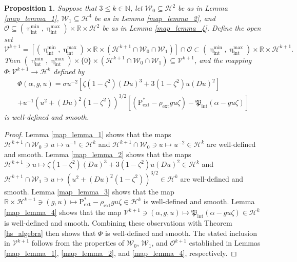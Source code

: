 \documentclass[11pt,reqno]{amsart}
\numberwithin{equation}{section}
\newcommand{\m}{\mathrm}
\def\pfint{\mathfrak{P}_{\m{int}}}
\def\hint{\upeta_{\m{int}}}
\def\pext{\m{P}_{\m{ext}}}
\def\h{\mathcal{H}}
\def\N{\mathbb{N}}
\def\R{\mathbb{R}}
\newtheorem{prop}[lem]{Proposition}
\begin{document}
\begin{prop}\label{map_prop_1}
Suppose that $3 \le k \in \N$, let $\mathcal{W}_0 \subseteq \h^2$ be as in Lemma \ref{map_lemma_1}, $\mathcal{W}_1 \subseteq \h^4$ be as in Lemma \ref{map_lemma_2}, and $\mathcal{O} \subseteq  (\hint^{\m{min}}, \hint^{\m{max}}) \times \R \times \h^2$ be as in Lemma \ref{map_lemma_4}.  Define the open set 
\begin{equation}
 \mathcal{V}^{k+1} =   [(\hint^{\m{min}}, \hint^{\m{max}}) \times \R \times    (\h^{k+1} \cap \mathcal{W}_0  \cap \mathcal{W}_1   )   ] \cap \mathcal{O}  \subset (\hint^{\m{min}}, \hint^{\m{max}})\times \R \times \h^{k+1}.
\end{equation}
Then $(\hint^{\m{min}}, \hint^{\m{max}}) \times \{0\} \times (\h^{k+1} \cap \mathcal{W}_0  \cap \mathcal{W}_1   ) \subseteq   \mathcal{V}^{k+1}$, and the mapping $\Phi : \mathcal{V}^{k+1} \to \h^k$ defined by 
\begin{multline}
 \Phi(\alpha,g,u) = 
\sigma u^{-2}  \left[   \zeta (1-\zeta^2) (Du)^3 + 3(1-\zeta^2) u(Du)^2     \right] \\
+ u^{-1} (  u^2 + (Du)^2 (1-\zeta^2)  )^{3/2} \left[ (\pext^\ast- \rho_{\m{ext}} g u \zeta) -\pfint (\alpha-g u \zeta)   
\right] 
\end{multline}
is well-defined and smooth. 
\end{prop}
\begin{proof}
Lemma \ref{map_lemma_1} shows that the maps $\h^{k+1} \cap \mathcal{W}_0 \ni u \mapsto u^{-1} \in \h^{k}$ and $\h^{k+1} \cap \mathcal{W}_0 \ni u \mapsto u^{-2} \in \h^{k}$ are well-defined and smooth.  Lemma \ref{map_lemma_2} shows that the maps $\h^{k+1} \ni u \mapsto   \zeta (1-\zeta^2) (Du)^3 + 3(1-\zeta^2) u(Du)^2   \in \h^{k}$ and $\h^{k+1} \cap \mathcal{W}_1 \ni u \mapsto (  u^2 + (Du)^2 (1-\zeta^2)  )^{3/2}\in \h^k$ are well-defined and smooth.  Lemma \ref{map_lemma_3} shows that the map $\R \times \h^{k+1} \ni (g,u) \mapsto \pext^\ast- \rho_{\m{ext}} g u \zeta \in \h^k$ is well-defined and smooth.  Lemma \ref{map_lemma_4} shows that the map $\mathcal{V}^{k+1} \ni (\alpha,g,u) \mapsto \pfint (\alpha-g u \zeta)  \in \h^k$ is well-defined and smooth.  Combining these observations with Theorem \ref{hs_algebra} then shows that $\Phi$ is well-defined and smooth.  The stated inclusion in $\mathcal{V}^{k+1}$ follows from the properties of $\mathcal{W}_0$, $\mathcal{W}_1$, and $\mathcal{O}^{k+1}$ established in Lemmas \ref{map_lemma_1}, \ref{map_lemma_2}, and \ref{map_lemma_4}, respectively.
\end{proof}
\end{document}
